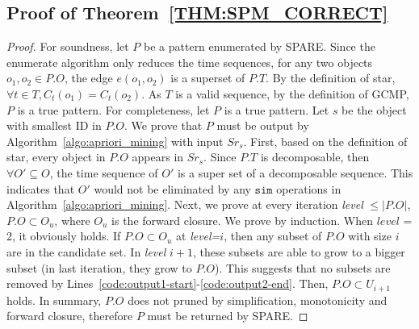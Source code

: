 \subsection{Proof of Theorem~\ref{THM:SPM_CORRECT}}
\begin{proof}
For soundness, let $P$ be a pattern enumerated by SPARE. Since the enumerate algorithm only reduces the time sequences, for any two objects $o_1, o_2 \in P.O$, the edge $e(o_1,o_2)$ is a superset of $P.T$. By the definition of star, $\forall t \in T, C_t(o_1) = C_t(o_2)$. As $T$ is a valid sequence, by the definition of GCMP, $P$ is a true pattern.
For completeness, let $P$ is a true pattern. Let $s$ be the object with smallest ID in $P.O$. We prove that $P$ must be output by Algorithm~\ref{algo:apriori_mining} with input $Sr_s$. 
First, based on the definition of star, every object in $P.O$ appears in $Sr_s$. Since $P.T$ is decomposable, then $\forall O' \subseteq O$, the time sequence of $O'$ is a super set of a decomposable sequence. This indicates that $O'$ would not be eliminated by any $\mathtt{sim}$ operations in Algorithm~\ref{algo:apriori_mining}.  Next, we prove at every iteration \emph{level} $\leq |P.O|$, $P.O \subset O_u$, where $O_u$ is the forward closure. We prove by induction. When $level$ = 2, it obviously holds. If $P.O \subset O_u$ at \emph{level=$i$}, then any subset of $P.O$ with size $i$ are in the candidate set. In \emph{level} $i+1$, these subsets are able to grow to a bigger subset (in last iteration, they grow to $P.O$). This suggests that no subsets are removed by Lines~\ref{code:output1-start}-\ref{code:output2-end}. Then, $P.O \subset U_{i+1}$ holds. In summary, $P.O$ does not pruned by simplification, monotonicity and forward closure, therefore $P$ must be returned by SPARE.
%

%
\end{proof}

